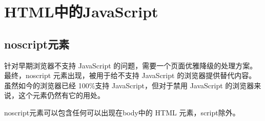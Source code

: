 \chapter{HTML中的JavaScript}
\section{noscript元素}
针对早期浏览器不支持 JavaScript 的问题，需要一个页面优雅降级的处理方案。最终，noscript
元素出现，被用于给不支持 JavaScript 的浏览器提供替代内容。虽然如今的浏览器已经 100\%支持
JavaScript，但对于禁用 JavaScript 的浏览器来说，这个元素仍然有它的用处。

noscript元素可以包含任何可以出现在body中的 HTML 元素，script除外。